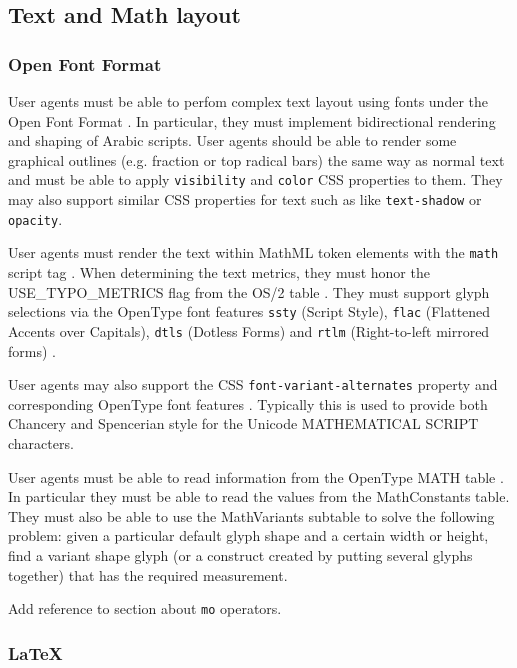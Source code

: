 \subsection{Text and Math layout}

\subsubsection{Open Font Format}

User agents must be able to perfom complex text layout \cite{CTL} using
fonts under the Open Font Format \cite{OpenFontFormat3}. In particular, they
must implement bidirectional rendering and shaping of Arabic scripts.
User agents should be able to render some graphical outlines (e.g. fraction
or top radical bars) the same way as normal text and must be able to apply
{\tt visibility} and {\tt color} CSS properties to them. They may also
support similar CSS properties for text such as like {\tt text-shadow} or
{\tt opacity}.

User agents must render the text within MathML token elements with the
{\tt math} script tag \cite{OpenFontFormat3}. When determining the
text metrics, they must honor the USE\_TYPO\_METRICS flag from the OS/2 table
\cite{OpenFontFormat3}.
They must support glyph selections via the OpenType font
features {\tt ssty} (Script Style), {\tt flac}
(Flattened Accents over Capitals), {\tt dtls} (Dotless Forms)
and {\tt rtlm} (Right-to-left mirrored forms) \cite{OpenFontFormat3}.

User agents may also support the CSS {\tt font-variant-alternates} property
and corresponding OpenType font features \cite{CSS3Font} \cite{OpenFontFormat3}.
Typically this is used to provide both Chancery and Spencerian style for
the Unicode MATHEMATICAL SCRIPT characters.

User agents must be able to read information from the
OpenType MATH table \cite{OpenFontFormat3}.
In particular they must be able to read the values from the MathConstants
table. They must also be able to use the MathVariants subtable to solve the
following problem: given a particular default glyph shape and a
certain width or height, find a variant shape glyph (or a construct created by
putting several glyphs together) that has the required measurement.

Add reference to section about {\tt mo} operators. 

\subsubsection{LaTeX}\label{LaTeX}

